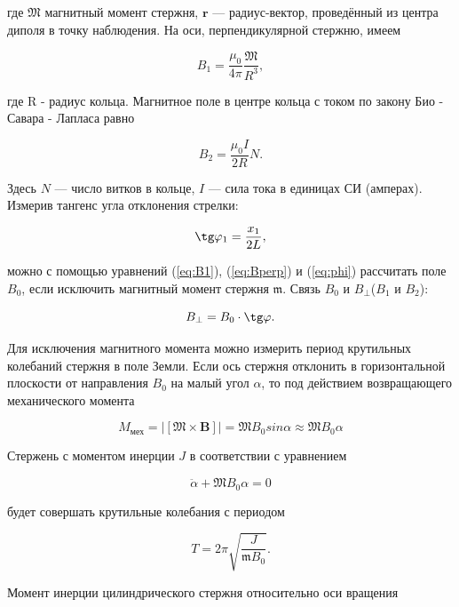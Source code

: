 \documentclass[a4paper,12pt]{article} %
\begin{document}
где $\mathfrak{M}$ магнитный момент стержня, $\textbf{r}$ — радиус-вектор, проведённый из центра диполя в точку наблюдения. На оси, перпендикулярной стержню, имеем

\begin{equation}
	B_1 = \frac{\mu_0}{4\pi}\frac{\mathfrak{M}}{R^3},
	\label{eq:B1}
\end{equation}

где R - радиус кольца.
Магнитное поле в центре кольца с током по закону Био - Савара - Лапласа равно

\begin{equation}
	B_2 = \frac{\mu_0 I}{2R}N.
	\label{eq:B2}
\end{equation}

Здесь $N$ — число витков в кольце, $I$ — сила тока в единицах СИ (амперах).
Измерив тангенс угла отклонения стрелки:

\begin{equation}
	\tg \varphi_1 = \frac{x_1}{2L},
	\label{eq:phi}
\end{equation}

можно с помощью уравнений (\ref{eq:B1}), (\ref{eq:Bperp}) и (\ref{eq:phi}) рассчитать поле $B_0$, если исключить магнитный момент стержня $\mathfrak{m}$.
Связь $B_0$ и $B_\perp$($B_1$ и $B_2$):

\begin{equation}
	B_\perp = B_0 \cdot \tg \varphi.
	\label{eq:Bperp}
\end{equation}

Для исключения магнитного момента можно измерить период крутильных колебаний стержня в поле Земли. Если ось стержня отклонить в горизонтальной плоскости от
направления $B_0$ на малый угол $\alpha$, то под действием возвращающего механического момента

$$ M_\text{мех}=|\left[\mathfrak{M}\times \textbf{B}\right] |=\mathfrak{M} B_0 sin \alpha \approx \mathfrak{M} B_0 \alpha $$

Стержень с моментом инерции $J$ в соответствии с уравнением

$$\ddot{\alpha}+\mathfrak{M} B_0 \alpha = 0$$

будет совершать крутильные колебания с периодом

\begin{equation}
	T = 2\pi \sqrt{\frac{J}{\mathfrak{m} B_0}}.
	\label{eq:t}
\end{equation}

Момент инерции цилиндрического стержня относительно оси вращения
\end{document}
